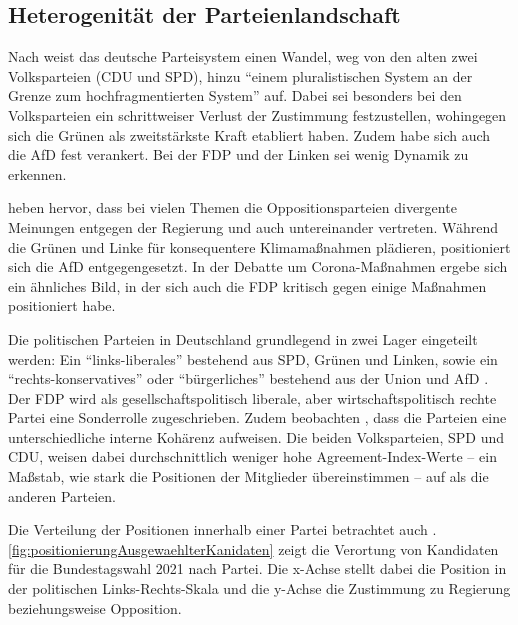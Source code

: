 \subsection{Heterogenität der Parteienlandschaft} \label{subsec:heterogenitätParteien}

Nach \textcite{niedermayer_entwicklung_2020} weist das deutsche Parteisystem einen Wandel, weg von den alten zwei Volksparteien (\ac{CDU} und \ac{SPD}), hinzu \enquote{einem pluralistischen System an der Grenze zum hochfragmentierten System} auf. Dabei sei besonders bei den Volksparteien ein schrittweiser Verlust der Zustimmung festzustellen, wohingegen sich die Grünen als zweitstärkste Kraft etabliert haben. Zudem habe sich auch die \ac{AfD} fest verankert. Bei der \ac{FDP} und der Linken sei wenig Dynamik zu erkennen.

\textcite{engler_wettbewerb_2022} heben hervor, dass bei vielen Themen die Oppositionsparteien divergente Meinungen entgegen der Regierung und auch untereinander vertreten. Während die Grünen und Linke für konsequentere Klimamaßnahmen plädieren, positioniert sich die \ac{AfD} entgegengesetzt. In der Debatte um Corona-Maßnahmen ergebe sich ein ähnliches Bild, in der sich auch die \ac{FDP} kritisch gegen einige Maßnahmen positioniert habe.

Die politischen Parteien in Deutschland grundlegend in zwei Lager eingeteilt werden: Ein \enquote{links-liberales} bestehend aus \ac{SPD}, Grünen und Linken, sowie ein \enquote{rechts-konservatives} oder \enquote{bürgerliches} bestehend aus der Union und \ac{AfD} \autocite{thomeczek_politische_2019}. Der \ac{FDP} wird als gesellschaftspolitisch liberale, aber wirtschaftspolitisch rechte Partei eine Sonderrolle zugeschrieben. Zudem beobachten \textcite{thomeczek_politische_2019}, dass die Parteien eine unterschiedliche interne Kohärenz aufweisen. Die beiden Volksparteien, \ac{SPD} und \ac{CDU}, weisen dabei durchschnittlich weniger hohe Agreement-Index-Werte -- ein Maßstab, wie stark die Positionen der Mitglieder übereinstimmen -- auf als die anderen Parteien.

Die Verteilung der Positionen innerhalb einer Partei betrachtet auch \textcite{saltzer_bundestagswahl_2022}. \autoref{fig:positionierungAusgewaehlterKanidaten} zeigt die Verortung von Kandidaten für die Bundestagswahl \num{2021} nach Partei. Die x-Achse stellt dabei die Position in der politischen Links-Rechts-Skala und die y-Achse die Zustimmung zu Regierung beziehungsweise Opposition.

